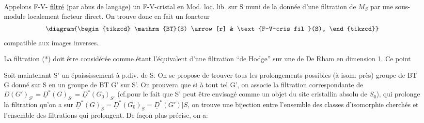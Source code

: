 Appelons F-V-\uline{} \uline{filtré} (par abus de langage) un F-V-cristal en Mod. loc. lib. sur S muni de la donnée d'une filtration de $M_S$ par une sous-module localement facteur direct. On trouve donc en fait un foncteur
\[
\diagram{\begin{tikzcd}
\mathrm{BT}(S) \arrow[r] & \text{F-V-cris fil }(S),
\end{tikzcd}}
\]
compatible aux images inverses.

La filtration (*) doit être considérée comme étant l'équivalent d'une filtration ``de Hodge'' sur une  de De Rham  en dimension 1.  Ce point

Soit maintenant S' un épaississement à p.div. de S. On se propose de trouver tous les prolongements possibles (à isom. près)  groupe de BT G donné sur S en un groupe de BT G' sur S'. On  prouvera que si à tout tel G', on associe la filtration correspondante de $D(G')_{S'}=\underline D^*(G)_{S'}=\underline D^*(G_0)_{S'}$ (cf.\qquad pour le fait que S' peut être envisagé comme un objet du site cristallin absolu de $S_0$), qui prolonge la filtration qu'on a sur $\underline D^*(G)_S=\underline D^*(G_0)_S=\underline D^*(G')|S$, on trouve une bijection entre l'ensemble des classes d'isomorphie cherchés et l'ensemble des filtrations qui prolongent. De façon plus précise, on a:

